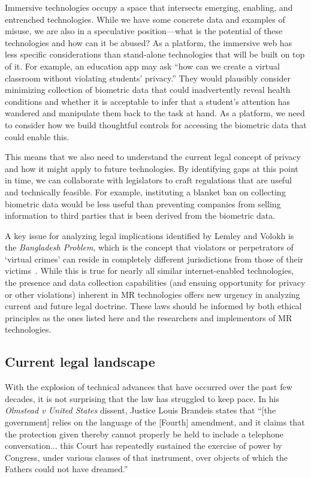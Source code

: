 Immersive technologies occupy a space that intersects emerging, enabling, and entrenched technologies. While we have some concrete data and examples of misuse, we are also in a speculative position---what is the potential of these technologies and how can it be abused? As a platform, the immersive web has less specific considerations than stand-alone technologies that will be built on top of it. For example, an education app may ask ``how can we create a virtual classroom without violating students' privacy.'' They would plausibly consider minimizing collection of biometric data that could inadvertently reveal health conditions and whether it is acceptable to infer that a student's attention has wandered and manipulate them back to the task at hand. As a platform, we need to consider how we build thoughtful controls for accessing the biometric data that could enable this.

This means that we also need to understand the current legal concept of privacy and how it might apply to future technologies. By identifying gaps at this point in time, we can collaborate with legislators to craft regulations that are useful and technically feasible. For example, instituting a blanket ban on collecting biometric data would be less useful than preventing companies from selling information to third parties that is been derived from the biometric data.

A key issue for analyzing legal implications identified by Lemley and Volokh is the \emph{Bangladesh Problem}, which is the concept that violators or perpetrators of `virtual crimes' can reside in completely different jurisdictions from those of their victims~\cite{lemley2017law}. While this is true for nearly all similar internet-enabled technologies, the presence and data collection capabilities (and ensuing opportunity for privacy or other violations) inherent in MR technologies offers new urgency in analyzing current and future legal doctrine. These laws should be informed by both ethical principles as the ones listed here and the researchers and implementors of MR technologies.

\subsection{Current legal landscape}\label{sec:laws}

With the explosion of technical advances that have occurred over the past few decades, it is not surprising that the law has struggled to keep pace. In his \emph{Olmstead v United States} dissent, Justice Louis Brandeis states that ``[the government] relies on the language of the [Fourth] amendment, and it claims that the protection given thereby cannot properly be held to include a telephone conversation... this Court has repeatedly sustained the exercise of power by Congress, under various clauses of that instrument, over objects of which the Fathers could not have dreamed.''

